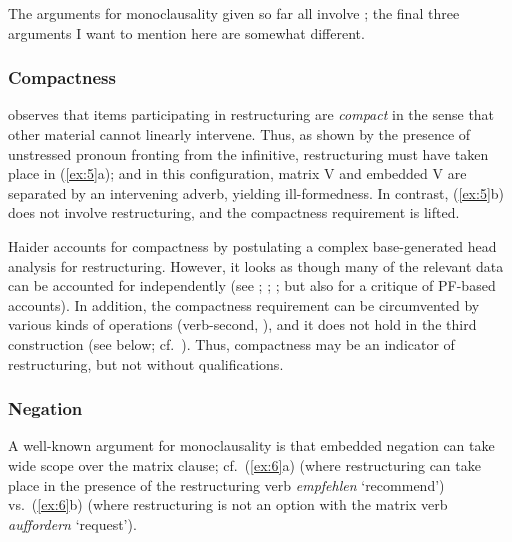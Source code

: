 \documentclass[output=paper]{langsci/langscibook}
\begin{document}
The arguments for monoclausality given so far all involve ; the final
three arguments I want to mention here are somewhat different.

\subsubsection{\label{m5}Compactness}

\citet{Haider:10} observes that items participating in restructuring are {\itshape compact} in the sense
that other material cannot linearly intervene. Thus, as shown by the
presence of unstressed pronoun fronting from the infinitive,
restructuring must have taken place in (\ref{ex:5}a); and in this
configuration, matrix V and embedded V are separated by an intervening adverb,
yielding ill-formedness. In contrast, (\ref{ex:5}b) does not involve
restructuring, and the compactness requirement is lifted.

\ea\label{ex:5} 
\z
\z

Haider accounts for compactness by postulating a complex base-generated head
analysis for restructuring. However, it looks as though many of the relevant
data can be accounted for independently (see \citealt{Buering&Hartmann:96};
\cite{Wurmbrand:07}; \cite[ch.~3]{Mueller:14:buf}; but also
\cite{Haider:16:com} for a critique of PF-based accounts). In addition, the
compactness requirement can be circumvented by various kinds of 
operations (verb-second, ), and it does not hold in the third
construction (see below; cf.\  \cite{Wurmbrand:07}). Thus, compactness may be an
indicator of restructuring, but not without qualifications.


\subsubsection{\label{m6}Negation}

A well-known argument for monoclausality is that embedded negation can take
wide scope over the matrix clause; cf.\ (\ref{ex:6}a) (where restructuring can
take place in the presence of the restructuring verb {\itshape empfehlen}
\enquote*{recommend}) vs.\ (\ref{ex:6}b) (where restructuring is not an option with the
matrix verb {\itshape auffordern} \enquote*{request}).
\end{document}
